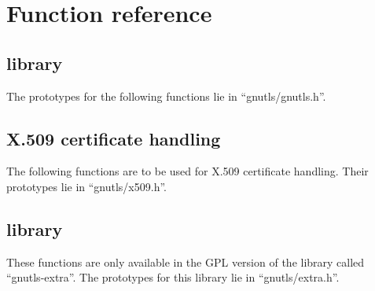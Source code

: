 \chapter{Function reference}

\section{\gnutls{} library}
The prototypes for the following functions lie
in ``gnutls/gnutls.h''.


\newpage

\section{\gnutls{} X.509 certificate handling}
\label{sec:x509api}
The following functions are to be used for X.509 certificate handling.
Their prototypes lie in ``gnutls/x509.h''.




\newpage


\section{\gnutlse{} library}
These functions are only available in the GPL version of the
library called ``gnutls-extra''. The prototypes for this library lie
in ``gnutls/extra.h''.



